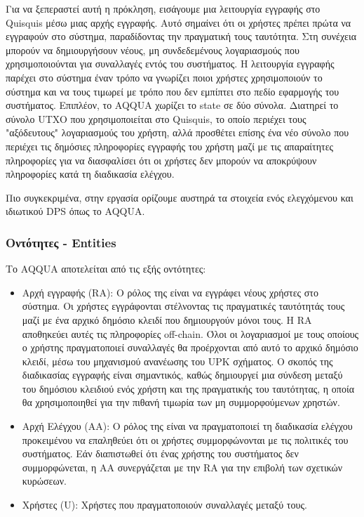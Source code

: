 Για να ξεπεραστεί αυτή η πρόκληση, εισάγουμε μια λειτουργία εγγραφής στο Quisquis μέσω μιας αρχής εγγραφής. Αυτό σημαίνει ότι οι χρήστες πρέπει πρώτα να εγγραφούν στο σύστημα, παραδίδοντας την πραγματική τους ταυτότητα. Στη συνέχεια μπορούν να δημιουργήσουν νέους, μη συνδεδεμένους λογαριασμούς που χρησιμοποιούνται για συναλλαγές εντός του συστήματος. Η λειτουργία εγγραφής παρέχει στο σύστημα έναν τρόπο να γνωρίζει ποιοι χρήστες χρησιμοποιούν το σύστημα και να τους τιμωρεί με τρόπο που δεν εμπίπτει στο πεδίο εφαρμογής του συστήματος. Επιπλέον, το AQQUA χωρίζει το state σε δύο σύνολα. Διατηρεί το σύνολο UTXO που χρησιμοποιείται στο Quisquis, το οποίο περιέχει τους "αξόδευτους" λογαριασμούς του χρήστη, αλλά προσθέτει επίσης ένα νέο σύνολο που περιέχει τις δημόσιες πληροφορίες εγγραφής του χρήστη μαζί με τις απαραίτητες πληροφορίες για να διασφαλίσει ότι οι χρήστες δεν μπορούν να αποκρύψουν πληροφορίες κατά τη διαδικασία ελέγχου.

Πιο συγκεκριμένα, στην εργασία ορίζουμε αυστηρά τα στοιχεία ενός ελεγχόμενου και ιδιωτικού DPS όπως το AQQUA.

\subsubsection{Οντότητες - Entities}
Το AQQUA αποτελείται από τις εξής οντότητες:
\begin{itemize}
    \item Αρχή εγγραφής (RA): Ο ρόλος της  είναι να εγγράφει νέους χρήστες στο σύστημα. Οι χρήστες εγγράφονται στέλνοντας τις πραγματικές ταυτότητάς τους μαζί με ένα αρχικό δημόσιο κλειδί που δημιουργούν μόνοι τους. Η RA αποθηκεύει αυτές τις πληροφορίες off-chain. Όλοι οι λογαριασμοί με τους οποίους ο χρήστης πραγματοποιεί συναλλαγές θα προέρχονται από αυτό το αρχικό δημόσιο κλειδί, μέσω του μηχανισμού ανανέωσης του UPK σχήματος. Ο σκοπός της διαδικασίας εγγραφής είναι σημαντικός, καθώς δημιουργεί μια σύνδεση μεταξύ του δημόσιου κλειδιού ενός χρήστη και της πραγματικής του ταυτότητας, η οποία θα χρησιμοποιηθεί για την πιθανή τιμωρία των μη συμμορφούμενων χρηστών.
    \item Αρχή Ελέγχου (ΑΑ): Ο ρόλος της είναι να πραγματοποιεί τη διαδικασία ελέγχου προκειμένου να επαληθεύει ότι οι χρήστες συμμορφώνονται με τις πολιτικές του συστήματος. Εάν διαπιστωθεί ότι ένας χρήστης του συστήματος δεν συμμορφώνεται, η ΑΑ συνεργάζεται με την RA για την επιβολή των σχετικών κυρώσεων.
    \item Χρήστες (U): Χρήστες που πραγματοποιούν συναλλαγές μεταξύ τους.
\end{itemize}

